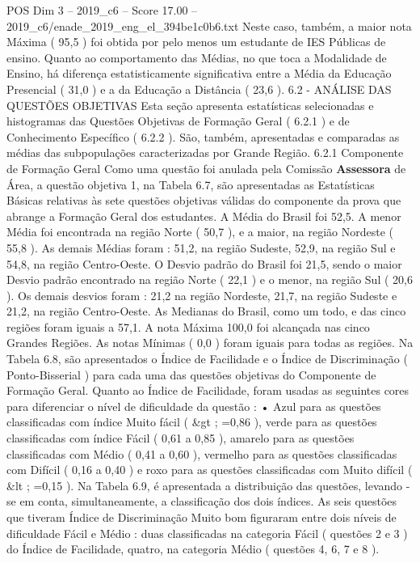 \begin{textsample}{POS Dim 3 – 2019\_c6 – Score 17.00 – 2019\_c6/enade\_2019\_eng\_el\_394be1c0b6.txt}
Neste caso, também, a maior nota Máxima ( 95,5 ) foi obtida por pelo menos um estudante de IES Públicas de ensino.
Quanto ao comportamento das Médias, no que toca a Modalidade de Ensino, há diferença estatisticamente significativa entre a Média da Educação Presencial ( 31,0 ) e a da Educação a Distância ( 23,6 ). 6.2 - ANÁLISE DAS QUESTÕES OBJETIVAS Esta seção apresenta estatísticas selecionadas e histogramas das Questões Objetivas de Formação Geral ( 6.2.1 ) e de Conhecimento Específico ( 6.2.2 ).
São, também, apresentadas e comparadas as médias das subpopulações caracterizadas por Grande Região. 6.2.1 Componente de Formação Geral Como uma questão foi anulada pela Comissão \textbf{Assessora} de Área, a questão objetiva 1, na Tabela 6.7, são apresentadas as Estatísticas Básicas relativas às sete questões objetivas válidas do componente da prova que abrange a Formação Geral dos estudantes.
A Média do Brasil foi 52,5.
A menor Média foi encontrada na região Norte ( 50,7 ), e a maior, na região Nordeste ( 55,8 ).
As demais Médias foram : 51,2, na região Sudeste, 52,9, na região Sul e 54,8, na região Centro-Oeste.
O Desvio padrão do Brasil foi 21,5, sendo o maior Desvio padrão encontrado na região Norte ( 22,1 ) e o menor, na região Sul ( 20,6 ).
Os demais desvios foram : 21,2 na região Nordeste, 21,7, na região Sudeste e 21,2, na região Centro-Oeste.
As Medianas do Brasil, como um todo, e das cinco regiões foram iguais a 57,1.
A nota Máxima 100,0 foi alcançada nas cinco Grandes Regiões.
As notas Mínimas ( 0,0 ) foram iguais para todas as regiões.
Na Tabela 6.8, são apresentados o Índice de Facilidade e o Índice de Discriminação ( Ponto-Bisserial ) para cada uma das questões objetivas do Componente de Formação Geral.
Quanto ao Índice de Facilidade, foram usadas as seguintes cores para diferenciar o nível de dificuldade da questão : • Azul para as questões classificadas com índice Muito fácil ( \&gt ; =0,86 ), verde para as questões classificadas com índice Fácil ( 0,61 a 0,85 ), amarelo para as questões classificadas com Médio ( 0,41 a 0,60 ), vermelho para as questões classificadas com Difícil ( 0,16 a 0,40 ) e roxo para as questões classificadas com Muito difícil ( \&lt ; =0,15 ).
Na Tabela 6.9, é apresentada a distribuição das questões, levando -se em conta, simultaneamente, a classificação dos dois índices.
As seis questões que tiveram Índice de Discriminação Muito bom figuraram entre dois níveis de dificuldade Fácil e Médio : duas classificadas na categoria Fácil ( questões 2 e 3 ) do Índice de Facilidade, quatro, na categoria Médio ( questões 4, 6, 7 e 8 ).

\end{textsample}
